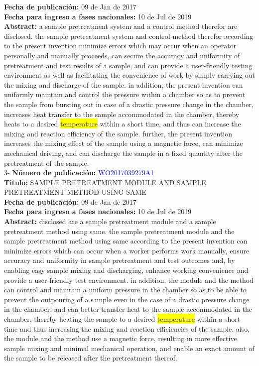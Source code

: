 \textbf{Fecha de publicación:} 09 de Jan de 2017\\ 
\textbf{Fecha para ingreso a fases nacionales:} 10 de Jul de 2019\\ 
\textbf{Abstract:} a sample pretreatment system and a control method therefor are disclosed. the sample pretreatment system and control method therefor according to the present invention minimize errors which may occur when an operator personally and manually proceeds, can secure the accuracy and uniformity of pretreatment and test results of a sample, and can provide a user-friendly testing environment as well as facilitating the convenience of work by simply carrying out the mixing and discharge of the sample. in addition, the present invention can uniformly maintain and control the pressure within a chamber so as to prevent the sample from bursting out in case of a drastic pressure change in the chamber, increases heat transfer to the sample accommodated in the chamber, thereby heats to a desired \colorbox{yellow}{temperature} within a short time, and thus can increase the mixing and reaction efficiency of the sample. further, the present invention increases the mixing effect of the sample using a magnetic force, can minimize mechanical driving, and can discharge the sample in a fixed quantity after the pretreatment of the sample.\\ 
 

 \vspace{1cm}3- \textbf{Número de publicación:} \href{https://worldwide.espacenet.com/publicationDetails/biblio?DB=EPODOC&II=0&ND=3&adjacent=true&locale=en_EP&FT=D&date=20160331&CC=WO&NR=2017039279A1&KC=A1#}{\textcolor{blue}{WO2017039279A1}}\\ 
\textbf{Titulo:} SAMPLE PRETREATMENT MODULE AND SAMPLE PRETREATMENT METHOD USING SAME\\ 
 
\textbf{Fecha de publicación:} 09 de Jan de 2017\\ 
\textbf{Fecha para ingreso a fases nacionales:} 10 de Jul de 2019\\ 
\textbf{Abstract:} disclosed are a sample pretreatment module and a sample pretreatment method using same. the sample pretreatment module and the sample pretreatment method using same according to the present invention can minimize errors which can occur when a worker performs work manually, ensure accuracy and uniformity in sample pretreatment and test outcomes and, by enabling easy sample mixing and discharging, enhance working convenience and provide a user-friendly test environment. in addition, the module and the method can control and maintain a uniform pressure in the chamber so as to be able to prevent the outpouring of a sample even in the case of a drastic pressure change in the chamber, and can better transfer heat to the sample accommodated in the chamber, thereby heating the sample to a desired \colorbox{yellow}{temperature} within a short time and thus increasing the mixing and reaction efficiencies of the sample. also, the module and the method use a magnetic force, resulting in more effective sample mixing and minimal mechanical operation, and enable an exact amount of the sample to be released after the pretreatment thereof.\\ 
 

